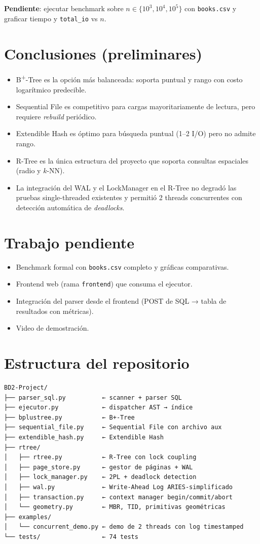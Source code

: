 \documentclass[11pt,a4paper]{article}
\begin{document}
\textbf{Pendiente}: ejecutar benchmark sobre $n \in \{10^3, 10^4, 10^5\}$
con \texttt{books.csv} y graficar tiempo y \texttt{total\_io} vs $n$.

\section{Conclusiones (preliminares)}

\begin{itemize}[nosep]
    \item B\textsuperscript{+}-Tree es la opción más balanceada: soporta puntual y rango con costo logarítmico predecible.
    \item Sequential File es competitivo para cargas mayoritariamente de lectura, pero requiere \emph{rebuild} periódico.
    \item Extendible Hash es óptimo para búsqueda puntual (1--2 I/O) pero no admite rango.
    \item R-Tree es la única estructura del proyecto que soporta consultas espaciales (radio y $k$-NN).
    \item La integración del WAL y el LockManager en el R-Tree no degradó las pruebas single-threaded existentes y permitió 2 threads concurrentes con detección automática de \emph{deadlocks}.
\end{itemize}

\section{Trabajo pendiente}
\begin{itemize}[nosep]
    \item Benchmark formal con \texttt{books.csv} completo y gráficas comparativas.
    \item Frontend web (rama \texttt{frontend}) que consuma el ejecutor.
    \item Integración del parser desde el frontend (POST de SQL → tabla de resultados con métricas).
    \item Video de demostración.
\end{itemize}

\appendix
\section{Estructura del repositorio}
\begin{verbatim}
BD2-Project/
├── parser_sql.py          ← scanner + parser SQL
├── ejecutor.py            ← dispatcher AST → índice
├── bplustree.py           ← B+-Tree
├── sequential_file.py     ← Sequential File con archivo aux
├── extendible_hash.py     ← Extendible Hash
├── rtree/
│   ├── rtree.py           ← R-Tree con lock coupling
│   ├── page_store.py      ← gestor de páginas + WAL
│   ├── lock_manager.py    ← 2PL + deadlock detection
│   ├── wal.py             ← Write-Ahead Log ARIES-simplificado
│   ├── transaction.py     ← context manager begin/commit/abort
│   └── geometry.py        ← MBR, TID, primitivas geométricas
├── examples/
│   └── concurrent_demo.py ← demo de 2 threads con log timestamped
└── tests/                 ← 74 tests
\end{verbatim}
\end{document}
